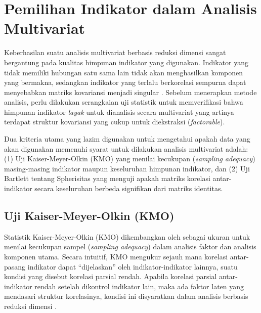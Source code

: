 \section{\normalsize Pemilihan Indikator dalam Analisis Multivariat}

Keberhasilan suatu analisis multivariat berbasis reduksi dimensi sangat bergantung pada kualitas himpunan indikator yang digunakan. Indikator yang tidak memiliki hubungan satu sama lain tidak akan menghasilkan komponen yang bermakna, sedangkan indikator yang terlalu berkorelasi sempurna dapat menyebabkan matriks kovariansi menjadi singular \citep{hair2019}. Sebelum menerapkan metode analisis, perlu dilakukan serangkaian uji statistik untuk memverifikasi bahwa himpunan indikator \textit{layak} untuk dianalisis secara multivariat yang artinya terdapat struktur kovariansi yang cukup untuk diekstraksi (\textit{factorable}).

Dua kriteria utama yang lazim digunakan untuk mengetahui apakah data yang akan digunakan memenuhi syarat untuk dilakukan analisis multivariat adalah: (1) Uji Kaiser-Meyer-Olkin (KMO) yang menilai kecukupan (\textit{sampling adequacy}) masing-masing indikator maupun keseluruhan himpunan indikator, dan (2) Uji Bartlett tentang Spherisitas yang menguji apakah matriks korelasi antar-indikator secara keseluruhan berbeda signifikan dari matriks identitas.

\subsection{\normalsize Uji Kaiser-Meyer-Olkin (KMO)}

Statistik Kaiser-Meyer-Olkin (KMO) dikembangkan oleh \citet{kaiser1970, kaiser1974} sebagai ukuran untuk menilai kecukupan sampel (\textit{sampling adequacy}) dalam analisis faktor dan analisis komponen utama. Secara intuitif, KMO mengukur sejauh mana korelasi antar-pasang indikator dapat ``dijelaskan'' oleh indikator-indikator lainnya, suatu kondisi yang disebut korelasi parsial rendah. Apabila korelasi parsial antar-indikator rendah setelah dikontrol indikator lain, maka ada faktor laten yang mendasari struktur korelasinya, kondisi ini disyaratkan dalam analisis berbasis reduksi dimensi \citep{dziuban1974}.

